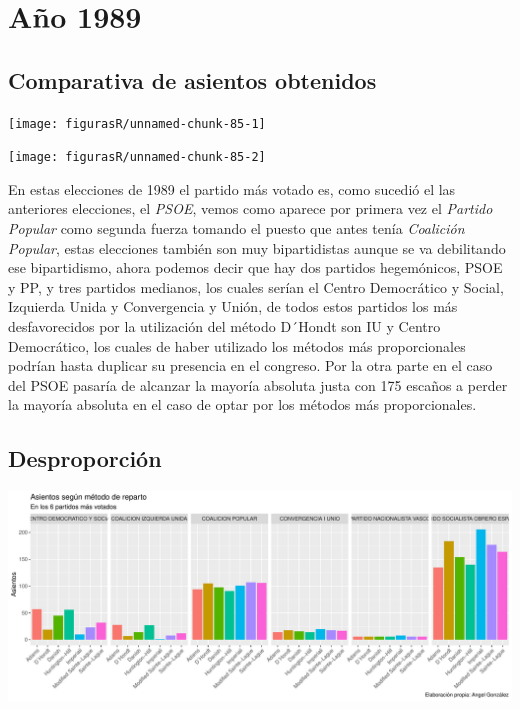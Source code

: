 \documentclass[12pt,a4paper,]{book}
\numberwithin{dummy}{section}
\theoremstyle{ocrenumbox}
\theoremstyle{blacknumex}
\theoremstyle{blacknumbox}
\theoremstyle{ocrenum}
\theoremstyle{ocrenum}
\begin{document}
\hypertarget{auxf1o-1989}{%
\section{Año 1989}\label{auxf1o-1989}}

\hypertarget{comparativa-de-asientos-obtenidos-4}{%
\subsection{Comparativa de asientos
obtenidos}\label{comparativa-de-asientos-obtenidos-4}}

\begin{center}\texttt{[image: figurasR/unnamed-chunk-85-1]} \end{center}

\begin{center}\texttt{[image: figurasR/unnamed-chunk-85-2]} \end{center}

En estas elecciones de 1989 el partido más votado es, como sucedió el
las anteriores elecciones, el \emph{PSOE}, vemos como aparece por
primera vez el \emph{Partido Popular} como segunda fuerza tomando el
puesto que antes tenía \emph{Coalición Popular}, estas elecciones
también son muy bipartidistas aunque se va debilitando ese bipartidismo,
ahora podemos decir que hay dos partidos hegemónicos, PSOE y PP, y tres
partidos medianos, los cuales serían el Centro Democrático y Social,
Izquierda Unida y Convergencia y Unión, de todos estos partidos los más
desfavorecidos por la utilización del método D´Hondt son IU y Centro
Democrático, los cuales de haber utilizado los métodos más
proporcionales podrían hasta duplicar su presencia en el congreso. Por
la otra parte en el caso del PSOE pasaría de alcanzar la mayoría
absoluta justa con 175 escaños a perder la mayoría absoluta en el caso
de optar por los métodos más proporcionales.

\hypertarget{desproporciuxf3n-4}{%
\subsection{Desproporción}\label{desproporciuxf3n-4}}

\begin{center}\includegraphics[width=1\linewidth]{figurasR/unnamed-chunk-86-1} \end{center}
\end{document}
